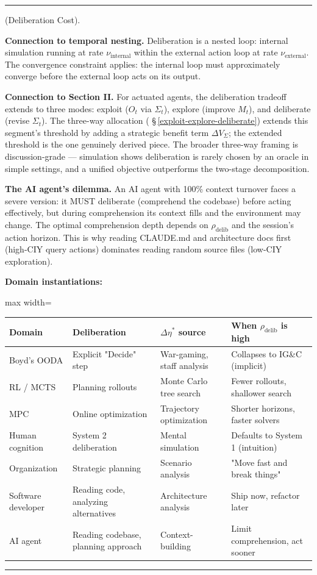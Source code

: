 \documentclass[11pt,oneside]{article}
\newcounter{claim}[section]
\renewcommand{\theclaim}{\thesection.\arabic{claim}}
\newenvironment{segment}[2]{%
  \refstepcounter{claim}%
  \bigskip\noindent\hrule\smallskip
  \noindent{\bfseries #1~\theclaim}\enskip(#2).\par\smallskip
  \noindent\ignorespaces
}{%
  \par\smallskip\noindent\hrule\bigskip
}
\newenvironment{proposition}[1][]{\begin{segment}{Proposition}{#1}}{\end{segment}}
\begin{document}
\begin{proposition}[Deliberation Cost]
\textbf{Connection to temporal nesting.} Deliberation is a nested loop: internal simulation running at rate $\nu_{\text{internal}}$ within the external action loop at rate $\nu_{\text{external}}$. The convergence constraint applies: the internal loop must approximately converge before the external loop acts on its output.

\textbf{Connection to Section II.} For actuated agents, the deliberation tradeoff extends to three modes: exploit ($O_t$ via $\Sigma_t$), explore (improve $M_t$), and deliberate (revise $\Sigma_t$). The three-way allocation ( \S\,\ref{exploit-explore-deliberate}) extends this segment's threshold by adding a strategic benefit term $\Delta V_\Sigma$; the extended threshold is the one genuinely derived piece. The broader three-way framing is discussion-grade — simulation shows deliberation is rarely chosen by an oracle in simple settings, and a unified objective outperforms the two-stage decomposition.

\textbf{The AI agent's dilemma.} An AI agent with 100\% context turnover faces a severe version: it MUST deliberate (comprehend the codebase) before acting effectively, but during comprehension its context fills and the environment may change. The optimal comprehension depth depends on $\rho_{\text{delib}}$ and the session's action horizon. This is why reading CLAUDE.md and architecture docs first (high-CIY query actions) dominates reading random source files (low-CIY exploration).

\textbf{Domain instantiations:}

\begin{adjustbox}{max width=\textwidth}
\small
\begin{tabular}{llll}
\toprule
Domain & Deliberation & $\Delta\eta^*$ source & When $\rho_{\text{delib}}$ is high \\
\midrule
Boyd's OODA & Explicit "Decide" step & War-gaming, staff analysis & Collapses to IG\&C (implicit) \\
RL / MCTS & Planning rollouts & Monte Carlo tree search & Fewer rollouts, shallower search \\
MPC & Online optimization & Trajectory optimization & Shorter horizons, faster solvers \\
Human cognition & System 2 deliberation & Mental simulation & Defaults to System 1 (intuition) \\
Organization & Strategic planning & Scenario analysis & "Move fast and break things" \\
Software developer & Reading code, analyzing alternatives & Architecture analysis & Ship now, refactor later \\
AI agent & Reading codebase, planning approach & Context-building & Limit comprehension, act sooner \\
\bottomrule
\end{tabular}
\end{adjustbox}



\end{proposition}
\end{document}
